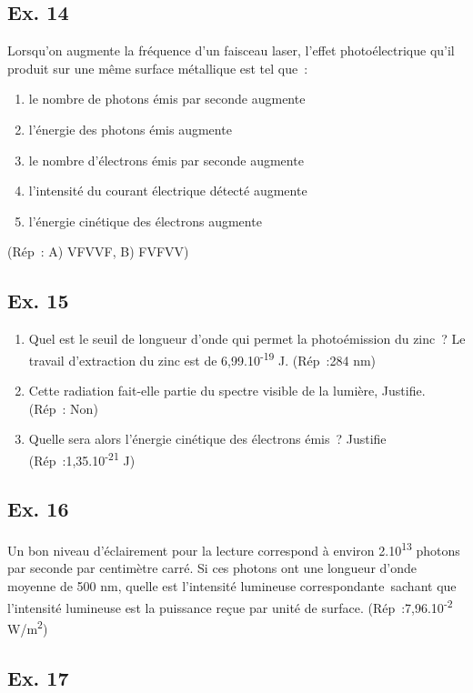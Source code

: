 {\subsection{Ex. 14}

Lorsqu'on augmente la fréquence d'un faisceau laser, l'effet
  photoélectrique qu'il produit sur une même surface métallique est tel
  que~:
\begin{enumerate}
  \item    le nombre de photons émis par seconde augmente
  \item    l'énergie des photons émis augmente
  \item le nombre d'électrons émis par seconde augmente
  \item    l'intensité du courant électrique détecté augmente
  \item    l'énergie cinétique des électrons augmente
\end{enumerate}
(Rép~: A) VFVVF, B) FVFVV)

\subsection{Ex. 15}

\begin{enumerate}
\item  Quel est le seuil de longueur d'onde qui permet la photoémission du
  zinc~? Le travail d'extraction du zinc est de
  6,99.10\textsuperscript{-19} J. (Rép~:284 nm)
\item  Cette radiation fait-elle partie du spectre visible de la lumière,
  Justifie. (Rép~: Non)
\item  Quelle sera alors l'énergie cinétique des électrons émis~? Justifie
  (Rép~:1,35.10\textsuperscript{-21} J)
\end{enumerate}

\subsection{Ex. 16}

Un bon niveau d'éclairement pour la lecture correspond à environ
2.10\textsuperscript{13} photons par seconde par centimètre carré. Si
ces photons ont une longueur d'onde moyenne de 500 nm, quelle est
l'intensité lumineuse correspondante~sachant que l'intensité lumineuse
est la puissance reçue par unité de surface.
(Rép~:7,96.10\textsuperscript{-2} W/m\textsuperscript{2})

\subsection{Ex. 17}

}
